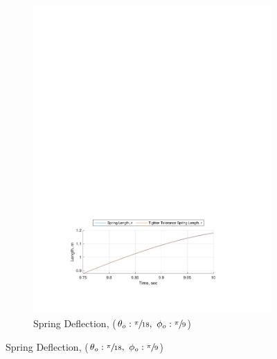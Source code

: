 \documentclass[12pt]{report}
\begin{document}
\begin{flushleft}
\begin{figure}[!htp]
\begin{subfigure}{\textwidth}
    \includegraphics[center]{2}
    \caption*{Spring Deflection, ($\theta_o:\sfrac{\pi}{18},~\phi_o:\sfrac{\pi}{9}$)}
  \end{subfigure}
\end{figure}
\begin{figure}[!htp] \ContinuedFloat
  \begin{subfigure}{\textwidth}

\end{subfigure}
\end{figure}
\end{flushleft}
\end{document}
